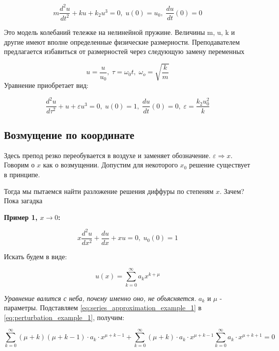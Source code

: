 	\begin{equation}
		m \frac{d^2u}{dt^2} + ku + k_2u^3 = 0, \; u(0) = u_0, \; \frac{du}{dt}(0) = 0
	\end{equation}
	
	Это модель колебаний тележке на нелинейной пружине. Величины m, u, k и другие имеют вполне определенные физические размерности. Преподавателем предлагается избавиться от размерностей через следующую замену переменных
	
	$$
	u = \frac u {u_0}, \; \tau = \omega_0t, \; \omega_o = \sqrt{\frac k m }
	$$
	Уравнение приобретает вид:
	
	\begin{equation}
		\frac{d^2u}{d\tau^2} + u + \varepsilon u^3 = 0, \; u(0) = 1, \; \frac {du}{dt}(0) = 0, \; \varepsilon = \frac {k_2 u_0^2} {k}
	\end{equation}
	
	\subsection{Возмущение по координате}
	
	Здесь препод резко переобувается в воздухе и заменяет обозначение. $\varepsilon \Rightarrow x$. Говорим о $x$ как о возмущении. Допустим для некоторого $x_0$ решение существует в принципе.
	
	Тогда мы пытаемся найти разложение решения диффуры по степеням $x$. Зачем? Пока загадка
	
	\textbf{Пример 1, $x\to0$:}
	
	\begin{equation}
		x \frac{d^2 u} {dx^2} + \frac {du} {dx} + xu = 0, \; u_0(0) = 1
		\label{eq:perturbation_example_1}
	\end{equation}
	
	Искать будем в виде:
	
	\begin{equation}
		u(x) = \sum_{k=0}^\infty a_k x^{k+\mu}
		\label{eq:series_approximation_example_1}
	\end{equation}
	
	\textit{Уравнение валится с неба, почему именно оно, не объясняется}. $a_k$ и $\mu$ - параметры. Подставляем \eqref{eq:series_approximation_example_1} в \eqref{eq:perturbation_example_1}, получим:
	
	\begin{equation}
		\sum_{k=0}^\infty (\mu + k) (\mu + k - 1) \cdot a_k \cdot x^{\mu + k - 1} + \sum_{k = 0} ^ \infty (\mu + k) \cdot a_k \cdot x^{\mu + k - 1} \sum_{k=0}^\infty a_k \cdot x^{\mu + k + 1} = 0
	\end{equation}
	
